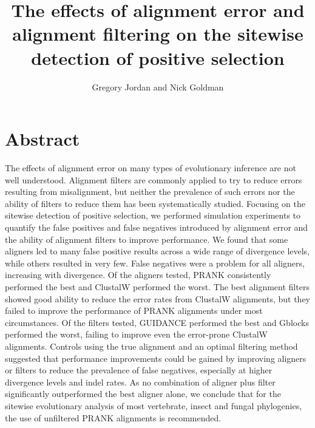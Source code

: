 \documentclass{article}
\begin{document}
\newcommand{\mtwo}{PAML M2a\xspace}
\newcommand{\meight}{PAML M8\xspace}
\newcommand{\pranka}{PRANK$_{\textrm{AA}}$\xspace}
\newcommand{\prankc}{PRANK$_{\textrm{C}}$\xspace}
\newcommand{\omg}{\bm{\omega}\xspace}
\newcommand{\tpr}{TPR$_{1\%}$\xspace}
\newcommand{\sw}{sitewise\xspace}
\newcommand{\Sw}{Sitewise\xspace}
\newcommand{\Dr}{{\em Drosophila}\xspace}

\title{The effects of alignment error and alignment filtering on the \sw detection of positive selection}

\author{{Gregory Jordan and Nick Goldman}\\
}

\section*{Abstract}

The effects of alignment error on many types of evolutionary inference
are not well understood. Alignment filters are commonly applied to try
to reduce errors resulting from misalignment, but neither the
prevalence of such errors nor the ability of filters to reduce them
has been systematically studied. Focusing on the sitewise detection of
positive selection, we performed simulation experiments to quantify
the false positives and false negatives introduced by alignment error
and the ability of alignment filters to improve performance. We found
that some aligners led to many false positive results across a wide
range of divergence levels, while others resulted in very few. False
negatives were a problem for all aligners, increasing with
divergence. Of the aligners tested, PRANK consistently performed the
best and ClustalW performed the worst. The best alignment filters
showed good ability to reduce the error rates from ClustalW
alignments, but they failed to improve the performance of PRANK
alignments under most circumstances. Of the filters tested, GUIDANCE
performed the best and Gblocks performed the worst, failing to improve
even the error-prone ClustalW alignments. Controls using the true
alignment and an optimal filtering method suggested that performance
improvements could be gained by improving aligners or filters to
reduce the prevalence of false negatives, especially at higher
divergence levels and indel rates. As no combination of aligner plus
filter significantly outperformed the best aligner alone, we conclude
that for the sitewise evolutionary analysis of most vertebrate, insect
and fungal phylogenies, the use of unfiltered PRANK alignments is
recommended.
\end{document}
